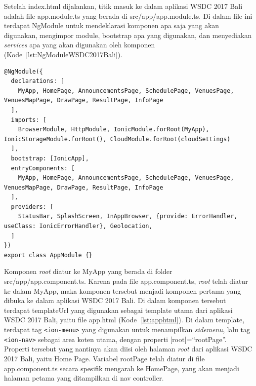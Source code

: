 Setelah index.html dijalankan, titik masuk ke dalam aplikasi WSDC 2017 Bali adalah file app.module.ts yang berada di src/app/app.module.ts. Di dalam file ini terdapat NgModule untuk mendeklarasi komponen apa saja yang akan digunakan, mengimpor module, bootstrap apa yang digunakan, dan menyediakan \textit{services} apa yang akan digunakan oleh komponen (Kode~\ref{lst:NgModuleWSDC2017Bali}).  

\begin{lstlisting}[label={lst:NgModuleWSDC2017Bali}, caption=NgModule pada app.module.ts]
@NgModule({
  declarations: [
    MyApp, HomePage, AnnouncementsPage, SchedulePage, VenuesPage, VenuesMapPage, DrawPage, ResultPage, InfoPage
  ],
  imports: [
    BrowserModule, HttpModule, IonicModule.forRoot(MyApp), IonicStorageModule.forRoot(), CloudModule.forRoot(cloudSettings)
  ],
  bootstrap: [IonicApp],
  entryComponents: [
    MyApp, HomePage, AnnouncementsPage, SchedulePage, VenuesPage, VenuesMapPage, DrawPage, ResultPage, InfoPage
  ],
  providers: [
    StatusBar, SplashScreen, InAppBrowser, {provide: ErrorHandler, useClass: IonicErrorHandler}, Geolocation,
  ]
})
export class AppModule {}
\end{lstlisting} 

Komponen \textit{root} diatur ke MyApp yang berada di folder src/app/app.component.ts. Karena pada file app.component.ts, \textit{root} telah diatur ke dalam MyApp, maka komponen tersebut menjadi komponen pertama yang dibuka ke dalam aplikasi WSDC 2017 Bali. Di dalam komponen tersebut terdapat templateUrl yang digunakan sebagai template utama dari aplikasi WSDC 2017 Bali, yaitu file app.html (Kode~\ref{lst:apphtml}). Di dalam template, terdapat tag \texttt{<ion-menu>} yang digunakan untuk menampilkan \textit{sidemenu}, lalu tag \texttt{<ion-nav>} sebagai area koten utama, dengan properti [root]=``rootPage''. Properti tersebut yang nantinya akan diisi oleh halaman \textit{root} dari aplikasi WSDC 2017 Bali, yaitu Home Page. Variabel rootPage telah diatur di file app.component.ts secara spesifik mengarah ke HomePage, yang akan menjadi halaman petama yang ditampilkan di nav controller. 


